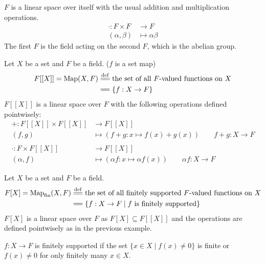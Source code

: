 \documentclass[11pt,fleqn]{book} %
\begin{document}
\begin{example}
    $F$ is a linear space over itself with the usual addition and multiplication operations.
    \[
        \begin{split}
            \cdot : F \times F &\to F \\
            (\alpha,\beta) &\mapsto \alpha \beta
        \end{split}
    \]
    The first $F$ is the field acting on the second $F$, which is the abelian group.
\end{example}

\newpage

\begin{example}
    Let $X$ be a set and $F$ be a field. ($f$ is a set map)
    \[
    \begin{split}
        F[[X]] = \text{Map}(X, F) &\overset{\mathrm{def}}{=\joinrel=} \text{the set of all $F$-valued functions on } X \\
        &=\joinrel= \left\{ f : X \to F \right\}
    \end{split}
    \]
    $F[[X]]$ is a linear space over $F$ with the following operations defined pointwisely:
    \[
        \begin{split}
            + : F[[X]] \times F[[X]] &\to F[[X]] \\
            (f,g) &\mapsto (f+g: x \mapsto f(x) + g(x)) \qquad f + g : X \to F \\ \\
            \cdot : F \times F[[X]] &\to F[[X]] \\
            (\alpha,f) &\mapsto (\alpha f: x \mapsto \alpha f(x)) \qquad \alpha f : X \to F
        \end{split}
    \]
\end{example}

\begin{example}
    Let $X$ be a set and $F$ be a field.
    \[
        \begin{split}
            F[X] = \text{Map}_{\text{fin}}(X, F) &\overset{\mathrm{def}}{=\joinrel=} \text{the set of all finitely supported $F$-valued functions on } X \\
            &=\joinrel= \left\{ f : X \to F \mid f \text{ is finitely supported} \right\}
        \end{split}
    \]
    $F[X]$ is a linear space over $F$ as $F[X] \subseteq F[[X]]$ and the operations are defined pointwisely as in the previous example.

    $f: X \to F$ is finitely supported if the set $\{ x \in X \mid f(x) \neq 0 \}$ is finite or $f(x) \neq 0$ for only finitely many $x \in X$.
\end{example}
\end{document}
